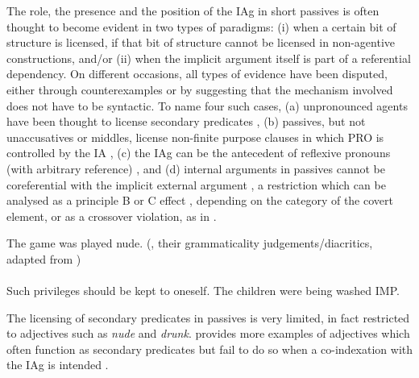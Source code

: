 \documentclass[output=paper]{langsci/langscibook}
\begin{document}
The role, the presence and the position of the \gls{IAg}
in short passives is often thought to become evident in two types of paradigms:
(i) when a certain bit of structure is licensed, if that bit of structure
cannot be licensed in non-agentive constructions, and/or (ii) when the implicit
argument itself is part of a referential dependency. On different occasions,
all types of evidence have been disputed, either through counterexamples or by
suggesting that the mechanism involved does not have to be syntactic. To name
four such cases, (a) unpronounced agents have been thought to license secondary
predicates , (b) passives, but not
unaccusatives or middles,
license non-finite purpose clauses in which PRO is controlled by the IA
, (c) the \gls{IAg} can be the
antecedent of reflexive pronouns (with arbitrary reference) ,
and (d) internal arguments in passives cannot be coreferential with the
implicit external argument , a restriction which can be
analysed as a principle B or C effect \parencite{Kratzer1994,Kratzer2000},
depending on the category of the covert element, or as a crossover violation,
as in \citet{BakJohRob1989}.

\ea\label{ex:22.1}
    The game was played nude.
\ex\label{ex:22.2} \citeauthor{BhattPancheva2006}
(\citeyear{BhattPancheva2006}, their grammaticality
judgements/diacritics, adapted from \citealt{Manzini1983})\\
    \z
\ex\label{ex:22.3}\textcite[228]{BakJohRob1989}\\
    Such privileges should be kept to oneself.
\ex\label{ex:22.4}
    The children were being washed IMP.
\z

The licensing of secondary predicates in  passives is very limited, in
fact restricted to adjectives such as \textit{nude} and \textit{drunk}. \citet{Landau2010}
provides more examples of adjectives which often function as secondary
predicates but fail to do so when a co-indexation with the \gls{IAg} is intended
.

\ea\label{ex:22.5}
    \z
\z
\end{document}
